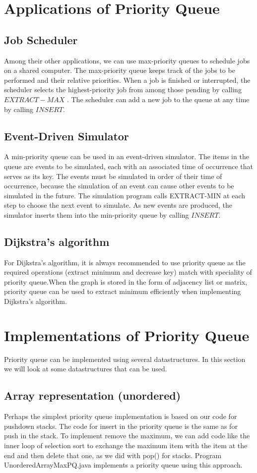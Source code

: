 \documentclass{article}
\begin{document}
\section{Applications of Priority Queue}
\subsection{Job Scheduler}
Among their other applications, we can use max-priority queues to schedule jobs on a shared computer. The max-priority queue keeps track of the jobs to be performed and their relative priorities. When a job is finished or interrupted, the scheduler selects the highest-priority job from among those pending by calling \textbf{$EXTRACT-MAX$} . The scheduler can add a new job to the queue at any time by calling \textbf{$INSERT$}.
\subsection{Event-Driven Simulator}

A min-priority queue can be used in an event-driven simulator. The items in the queue are events to be simulated, each with an associated time of occurrence that serves as its key. The events must be simulated in order of their time of occurrence, because the simulation of an event can cause other events to be simulated in the future. The simulation program calls EXTRACT-MIN at each step to choose the next event to simulate. As new events are produced, the simulator inserts them into the min-priority queue by calling \textbf{$INSERT$}.

\subsection{Dijkstra’s algorithm}
For Dijkstra’s algorithm, it is always recommended to use priority queue as the required operations (extract minimum and decrease key) match with speciality of priority queue.When the graph is stored in the form of adjacency list or matrix, priority queue can be used to extract minimum efficiently when implementing Dijkstra’s algorithm.

\section{Implementations of Priority Queue}
Priority queue can be implemented using several datastructures. In this section we will look at some datastructures that can be used.

\subsection{Array representation (unordered)}
Perhaps the simplest priority queue implementation is based on our code for pushdown stacks. The code for insert in the priority queue is the same as for push in the stack. To implement remove the maximum, we can add code like the inner loop of selection sort to exchange the maximum item with the item at the end and then delete that one, as we did with pop() for stacks. Program UnorderedArrayMaxPQ.java implements a priority queue using this approach.
\end{document}
